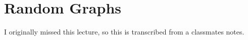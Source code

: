\section{Random Graphs}
\begin{note}{}
I originally missed this lecture, so this is transcribed from a classmates notes.
\end{note}
